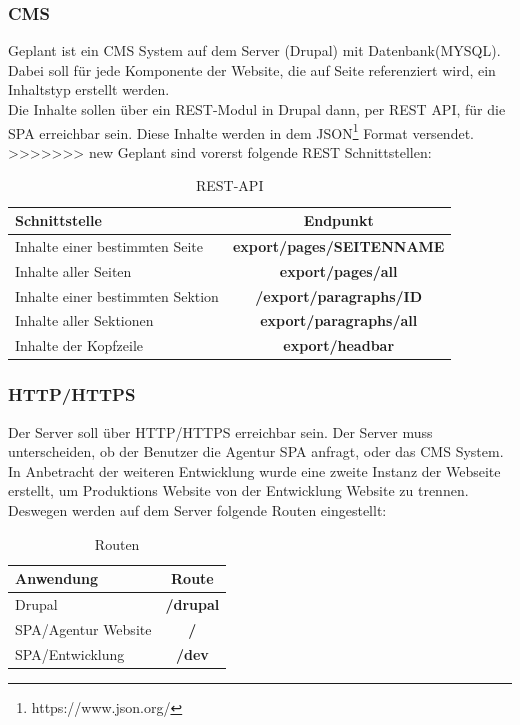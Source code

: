 \documentclass[11pt,a4paper]{article}
\begin{document}
\subsubsection{CMS}
Geplant ist ein CMS System auf dem Server (Drupal) mit Datenbank(MYSQL).\\ Dabei soll für jede Komponente der Website, die auf Seite \pageref{sec:epage}
referenziert wird, ein Inhaltstyp erstellt werden.\\
Die Inhalte sollen über ein REST-Modul in Drupal dann, per REST \acs{API}, für die SPA erreichbar sein.
Diese Inhalte werden in dem JSON\footnote{https://www.json.org/} Format versendet.
>>>>>>> new
Geplant sind vorerst folgende REST Schnittstellen:
\begin{table}[!ht]
  \centering
     \begin{tabular}{l|c}
       \textbf{Schnittstelle}  & \textbf{Endpunkt} \\
       \hline
       Inhalte einer bestimmten Seite & \textbf{export/pages/SEITENNAME} \\
       Inhalte aller Seiten & \textbf{export/pages/all} \\
       Inhalte einer bestimmten Sektion & \textbf{/export/paragraphs/ID} \\
       Inhalte aller Sektionen & \textbf{export/paragraphs/all}\\
       Inhalte der Kopfzeile & \textbf{export/headbar}\\
     \end{tabular}
\caption{REST-API}
\end{table}
\subsubsection{HTTP/HTTPS}
Der Server soll über HTTP/HTTPS erreichbar sein. Der Server muss unterscheiden, ob der Benutzer die Agentur SPA anfragt, oder das CMS System. In Anbetracht der weiteren Entwicklung wurde eine zweite Instanz der Webseite erstellt, um Produktions Website von der Entwicklung Website zu trennen. Deswegen werden auf dem Server folgende Routen eingestellt:
\begin{table}[!ht]
  \centering
     \begin{tabular}{l|c}
       \textbf{Anwendung}  & \textbf{Route} \\
       \hline
       Drupal & \textbf{/drupal}\\
       SPA/Agentur Website & \textbf{/}\\
       SPA/Entwicklung & \textbf{/dev}\\
     \end{tabular}
\caption{Routen}
\end{table}
\end{document}
